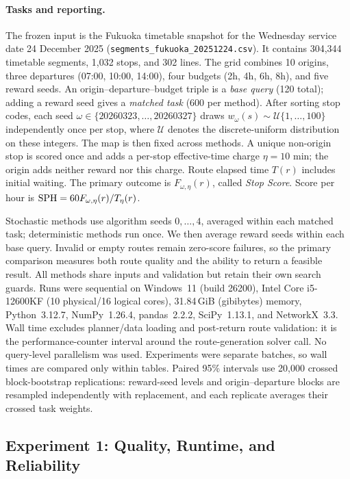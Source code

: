 \paragraph{Tasks and reporting.}
The frozen input is the Fukuoka timetable snapshot for the
Wednesday service date 24 December 2025
(\texttt{segments\_fukuoka\_20251224.csv}). It contains 304,344 timetable
segments, 1,032 stops, and 302 lines.
The grid combines 10 origins, three departures (07:00, 10:00, 14:00), four
budgets (2h, 4h, 6h, 8h), and five reward seeds. An
origin--departure--budget triple is a \emph{base query} (120 total); adding a
reward seed gives a \emph{matched task} (600 per method). After sorting stop
codes, each seed
\(\omega\in\{20260323,\ldots,20260327\}\) draws
\(w_\omega(s)\sim\mathcal U\{1,\ldots,100\}\) independently once per stop,
where \(\mathcal U\) denotes the discrete-uniform distribution on these integers.
The map is then fixed across methods. A unique non-origin stop is scored once
and adds a per-stop effective-time charge \(\eta=10\) min; the origin adds
neither reward nor this charge. Route
elapsed time \(T(r)\) includes initial waiting. The primary outcome is
\(F_{\omega,\eta}(r)\), called \emph{Stop Score}. Score per hour is
\({\rm SPH}=60F_{\omega,\eta}(r)/T_\eta(r)\).

Stochastic methods use algorithm seeds \(0,\ldots,4\), averaged within each
matched task; deterministic methods run once. We then average reward seeds
within each base query. Invalid or empty routes remain zero-score failures, so
the primary comparison measures both route quality and the ability to return a
feasible result. All methods share inputs and validation but retain their own
search guards. Runs were sequential on Windows~11 (build 26200), Intel Core
i5-12600KF (10 physical/16 logical cores), 31.84\,GiB (gibibytes) memory, Python~3.12.7,
NumPy~1.26.4, pandas~2.2.2, SciPy~1.13.1, and NetworkX~3.3. Wall time excludes
planner/data loading and post-return route validation: it is the performance-counter
interval around the route-generation solver call. No query-level parallelism was used. Experiments
were separate batches, so wall times are compared only within tables. Paired 95\%
intervals use 20,000 crossed block-bootstrap replications: reward-seed levels
and origin--departure blocks are resampled independently with replacement, and
each replicate averages their crossed task weights.

\subsection{Experiment 1: Quality, Runtime, and Reliability}
